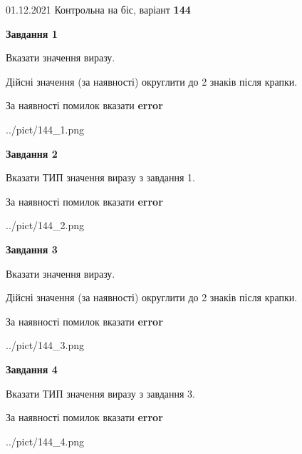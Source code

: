 \documentclass[11pt, ukrainian]{article}
\begin{document}
{01.12.2021 Контрольна на біс, варіант  \No \textbf { 144 }\par}
{
\begin {large}
{\begin {center}\textbf{Завдання 1}\end {center}}\par
Вказати значення виразу. \par
Дійсні значення (за наявності) округлити до 2 знаків після крапки. \par
За наявності помилок вказати \textbf{error}

\begin{center}
	{../pict/144_1.png}
\end{center}
\newpage

{\begin {center}\textbf{Завдання 2}\end {center}}\par
Вказати ТИП значення виразу з завдання 1. \par
За наявності помилок вказати \textbf{error}

\begin{center}
	{../pict/144_2.png}
\end{center}
\newpage

{\begin {center}\textbf{Завдання 3}\end {center}}\par
Вказати значення виразу. \par
Дійсні значення (за наявності) округлити до 2 знаків після крапки. \par
За наявності помилок вказати \textbf{error}

\begin{center}
	{../pict/144_3.png}
\end{center}
\newpage

{\begin {center}\textbf{Завдання 4}\end {center}}\par
Вказати ТИП значення виразу з завдання 3. \par
За наявності помилок вказати \textbf{error}

\begin{center}
	{../pict/144_4.png}
\end{center}
\newpage


\end{large}}
\end{document}
